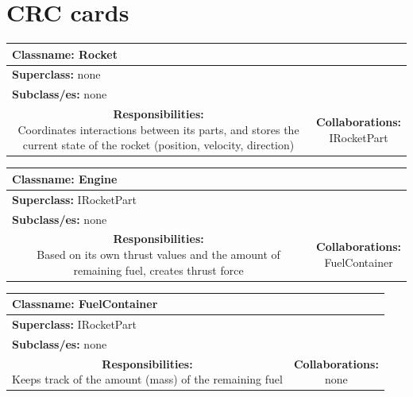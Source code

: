 \documentclass{article}
\begin{document}
\section{CRC cards}

\begin {center}

\begin{tabular}{|c|c|}
\hline
\multicolumn{2}{|l|}{\textbf{Classname:} Rocket}\\
\hline
\multicolumn{2}{|l|}{\textbf{Superclass:} none}\\
\multicolumn{2}{|l|}{\textbf{Subclass/es:} none}\\
\hline
\parbox[]{5cm}{\vspace{3px}\textbf{Responsibilities:} \\Coordinates interactions between its parts, and stores the current state of the rocket (position, velocity, direction)\vspace{3px}} & \parbox[]{5cm}{\textbf{Collaborations:}\\IRocketPart}\\
\hline
 \end{tabular}\vspace{.4cm}
 
\begin{tabular}{|c|c|}
\hline
\multicolumn{2}{|l|}{\textbf{Classname:} Engine}\\
\hline
\multicolumn{2}{|l|}{\textbf{Superclass:} IRocketPart}\\
\multicolumn{2}{|l|}{\textbf{Subclass/es:} none}\\
\hline
\parbox[]{5cm}{\vspace{3px}\textbf{Responsibilities:} \\Based on its own thrust values and the amount of remaining fuel, creates thrust force\vspace{3px}} & \parbox[]{5cm}{\textbf{Collaborations:}\\FuelContainer}\\
\hline
 \end{tabular}\vspace{.4cm}

\begin{tabular}{|c|c|}
\hline
\multicolumn{2}{|l|}{\textbf{Classname:} FuelContainer}\\
\hline
\multicolumn{2}{|l|}{\textbf{Superclass:} IRocketPart}\\
\multicolumn{2}{|l|}{\textbf{Subclass/es:} none}\\
\hline
\parbox[]{5cm}{\vspace{3px}\textbf{Responsibilities:} \\Keeps track of the amount (mass) of the remaining fuel\vspace{3px}} & \parbox[]{5cm}{\textbf{Collaborations:}\\none}\\
\hline
 \end{tabular}\vspace{.4cm}


\end{center}
\end{document}
